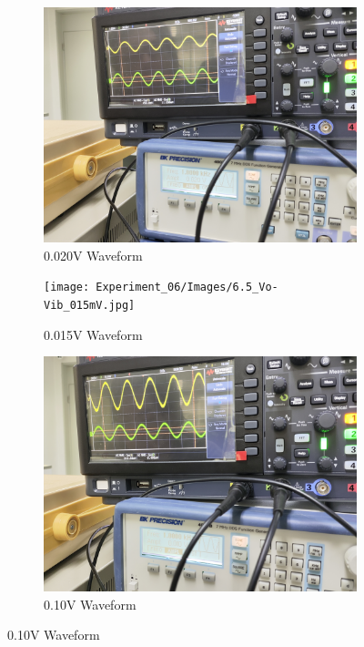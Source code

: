 \begin{figure}[H]
        \begin{subfigure}{0.25\textwidth}
            \centering
            \includegraphics[width=1\linewidth]{Experiment_06/Images/6.5_Vo-Vib_020mV.jpg}
            \caption{0.020V Waveform}
            \label{l6dc020}
        \end{subfigure}
        \begin{subfigure}{0.25\textwidth}
            \centering
            \texttt{[image: Experiment\_06/Images/6.5\_Vo-Vib\_015mV.jpg]}
            \caption{0.015V Waveform}
            \label{l6acvg015}
        \end{subfigure}
        \begin{subfigure}{0.25\textwidth}
            \centering
            \includegraphics[width=1\linewidth]{Experiment_06/Images/6.5_Vo-Vib_010mV.jpg}
            \caption{0.10V Waveform}
            \label{l6acvg010}
        \end{subfigure}
    \end{figure}

